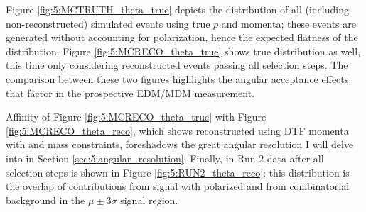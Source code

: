Figure \ref{fig:5:MCTRUTH_theta_true} depicts the \cthetap distribution of all (including non-reconstructed) simulated \demonstratorshort events using true $p$ and \pim momenta;
these events are generated without accounting for \lz polarization, hence the expected flatness of the distribution.
Figure \ref{fig:5:MCRECO_theta_true} shows true \cthetap distribution as well, this time only considering reconstructed events passing all selection steps. The comparison between these two figures highlights the angular acceptance effects that factor in the prospective \lz EDM/MDM measurement.

Affinity of Figure \ref{fig:5:MCRECO_theta_true} with Figure \ref{fig:5:MCRECO_theta_reco}, which shows reconstructed \cthetap using DTF momenta with \jpsi and \lz mass constraints, foreshadows the great angular resolution I will delve into in Section \ref{sec:5:angular_resolution}.
Finally, \cthetap in Run 2 data after all selection steps is shown in Figure \ref{fig:5:RUN2_theta_reco}:
this distribution is the overlap of contributions from \demonstratorshort signal with polarized \lz and from combinatorial background in the $\mu \pm 3\sigma$ signal region.


